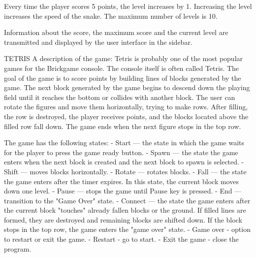 \documentclass[a4paper]{article}
\begin{document}
Every time the player scores 5 points, the level increases by 1.
Increasing the level increases the speed of the snake. The maximum number of levels is 10.\newline

Information about the score, the maximum score and the current level are transmitted and displayed by the user interface in the sidebar.
\newline
\newline

TETRIS\newline
\newline
A description of the game:\newline
Tetris is probably one of the most popular games for the Brickgame console.
The console itself is often called Tetris. The goal of the game is to score points by building lines of blocks generated by the game.
The next block generated by the game begins to descend down the playing field until it reaches the bottom or collides with another block.
The user can rotate the figures and move them horizontally, trying to make rows.
After filling, the row is destroyed, the player receives points, and the blocks located above the filled row fall down.
The game ends when the next figure stops in the top row.
\newline

The game has the following states:\newline
- Start — the state in which the game waits for the player to press the game ready button.\newline
- Spawn — the state the game enters when the next block is created and the next block to spawn is selected.\newline
- Shift — moves blocks horizontally.\newline
- Rotate — rotates blocks.\newline
- Fall — the state the game enters after the timer expires. In this state, the current block moves down one level.\newline
- Pause — stops the game until Pause key is pressed.\newline
- End — transition to the "Game Over" state.\newline
- Connect — the state the game enters after the current block "touches" already fallen blocks or the ground.\newline
If filled lines are formed, they are destroyed and remaining blocks are shifted down.\newline
If the block stops in the top row, the game enters the "game over" state.\newline
- Game over - option to restart or exit the game.\newline
- Restart - go to start.\newline
- Exit the game - close the program.\newline
\end{document}
